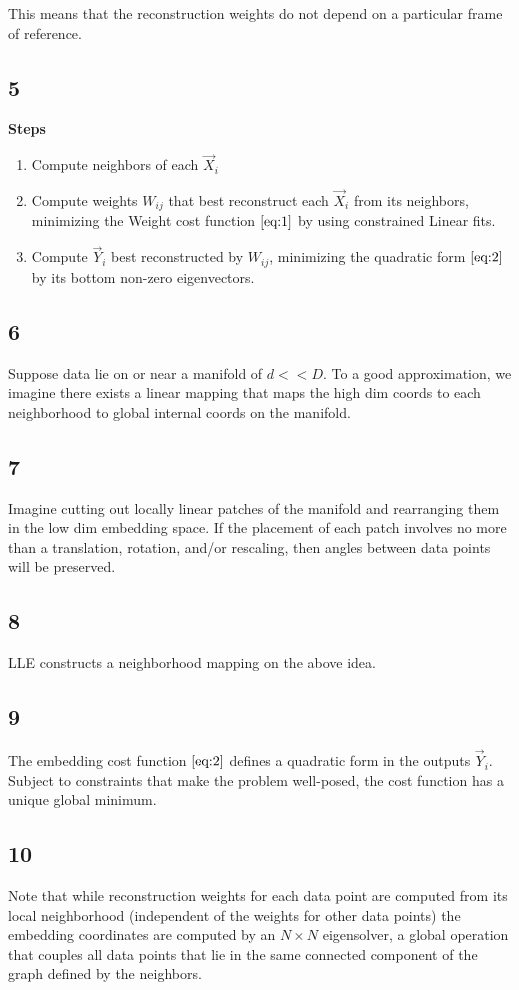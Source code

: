 \documentclass[11pt]{article}
\begin{document}
This means that the reconstruction weights do not depend on a particular frame
of reference.
\subsection{5}
\label{sec:org3638f82}
\textbf{Steps}
\begin{enumerate}
\item Compute neighbors of each \(\vec X_i\)
\item Compute weights \(W_{ij}\) that best reconstruct each \(\vec X_{i}\) from its
neighbors, minimizing the Weight cost function \(\eqref{eq:1}\) by using constrained Linear fits.
\item Compute \(\vec Y_i\) best reconstructed by \(W_{ij}\), minimizing the quadratic
form \(\eqref{eq:2}\) by its bottom non-zero eigenvectors.
\end{enumerate}

\subsection{6}
\label{sec:orgf7e576f}
Suppose data lie on or near a manifold of \(d << D\). To a good approximation, we
imagine there exists a linear mapping that maps the high dim coords to each
neighborhood to global internal coords on the manifold.
\subsection{7}
\label{sec:orgfeebf52}
Imagine cutting out locally linear patches of the manifold and rearranging them
in the low dim embedding space. If the placement of each patch involves no more
than a translation, rotation, and/or rescaling, then angles between data points
will be preserved.
\subsection{8}
\label{sec:org3299395}
LLE constructs a neighborhood mapping on the above idea.

\subsection{9}
\label{sec:org60514f1}
The embedding cost function \(\eqref{eq:2}\) defines a quadratic form in the
outputs \(\vec Y_i\). Subject to constraints that make the problem well-posed, the
cost function has a unique global minimum.
\subsection{10}
\label{sec:org6745020}
Note that while reconstruction weights for each data point are computed from its
local neighborhood (independent of the weights for other data points) the
embedding coordinates are computed by an \(N \times N\) eigensolver, a global
operation that couples all data points that lie in the same connected component
of the graph defined by the neighbors.
\end{document}
